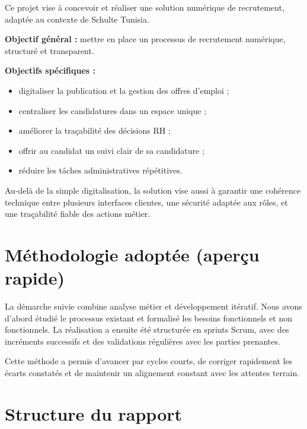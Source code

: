 Ce projet vise à concevoir et réaliser une solution numérique de
recrutement, adaptée au contexte de Schulte Tunisia.

\textbf{Objectif général :} mettre en place un processus de recrutement
numérique, structuré et transparent.

\textbf{Objectifs spécifiques :}
\begin{itemize}
    \item digitaliser la publication et la gestion des offres d'emploi ;
    \item centraliser les candidatures dans un espace unique ;
    \item améliorer la traçabilité des décisions RH ;
    \item offrir au candidat un suivi clair de sa candidature ;
    \item réduire les tâches administratives répétitives.
\end{itemize}

Au-delà de la simple digitalisation, la solution vise aussi à garantir une
cohérence technique entre plusieurs interfaces clientes, une sécurité
adaptée aux rôles, et une traçabilité fiable des actions métier.

\section*{Méthodologie adoptée (aperçu rapide)}

La démarche suivie combine analyse métier et développement itératif.
Nous avons d'abord étudié le processus existant et formalisé les besoins
fonctionnels et non fonctionnels. La réalisation a ensuite été structurée
en sprints Scrum, avec des incréments successifs et des validations
régulières avec les parties prenantes.

Cette méthode a permis d'avancer par cycles courts, de corriger rapidement
les écarts constatés et de maintenir un alignement constant avec les
attentes terrain.

\section*{Structure du rapport}

